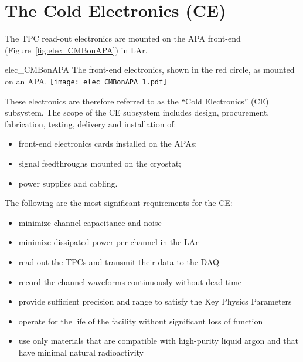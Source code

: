 \section{The Cold Electronics (CE)} 
\label{sec:detectors-fd-ref-ce}

The TPC read-out electronics are mounted on the APA front-end
(Figure~\ref{fig:elec_CMBonAPA}) in LAr.  
\begin{cdrfigure}{elec_CMBonAPA}
 {The front-end electronics, shown in the red circle, as mounted on an APA.}
\texttt{[image: elec\_CMBonAPA\_1.pdf]}
\end{cdrfigure}
These electronics are
therefore referred to as the ``Cold Electronics'' (CE) subsystem.  The
scope of the CE subsystem includes design, procurement,
fabrication, testing, delivery and installation of:
\begin{itemize}
\item front-end electronics cards installed on the APAs;
\item signal feedthroughs mounted on the cryostat;
\item power supplies and cabling.
\end{itemize}
The following are the most significant requirements for the CE:
\begin{itemize}	
\item minimize channel capacitance and noise
\item minimize dissipated power per channel in the LAr
\item read out the TPCs and transmit their data to the DAQ
\item record the channel waveforms continuously without dead time
\item provide sufficient precision and range to satisfy the Key Physics Parameters
\item operate for the life of the facility without significant loss of function
\item use only materials that are compatible with high-purity liquid argon and that have minimal natural radioactivity
\end{itemize}

